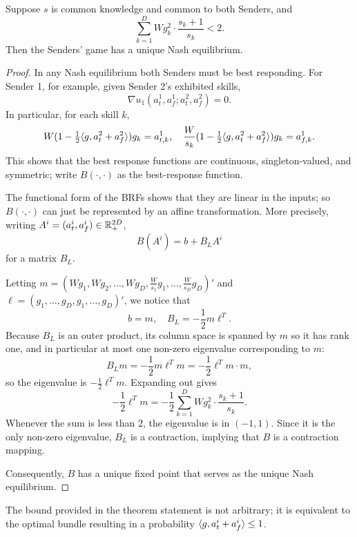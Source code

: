 \begin{theorem}
    Suppose $s$ is common knowledge and common to both Senders, and $$\sum_{k=1}^D Wg_k^2 \cdot \dfrac{s_k+1}{s_k}<2.$$ Then the Senders' game has a unique Nash equilibrium.
\end{theorem}
\begin{proof}
    In any Nash equilibrium both Senders must be best responding. For Sender 1, for example, given Sender 2's exhibited skills, $$\nabla u_1(a_t^1,a_f^1; a_t^2,a_f^2)=0.$$ In particular, for each skill $k$, $$W(1-\tfrac 1 2\langle g,a_t^2+a_f^2\rangle)g_k=a_{t,k}^1, \quad \dfrac W{s_k}(1-\tfrac 1 2\langle g,a_t^2+a_f^2\rangle)g_k=a_{f,k}^1.$$ This shows that the best response functions are continuous, singleton-valued, and symmetric; write $B(\cdot,\cdot)$ as the best-response function.

    The functional form of the BRFs shows that they are linear in the inputs; so $B(\cdot,\cdot)$ can just be represented by an affine transformation. More precisely, writing $A^i=(a_t^i,a_f^i) \in \mathbb{R}^{2D}_+$, $$B(A^i)=b+B_LA^i$$ for a matrix $B_L$.

    Letting $m=(Wg_1, Wg_2,\dots,Wg_D,\tfrac W{s_1}g_1,\dots,\tfrac W{s_D}g_D)'$ and $\ell=(g_1,\dots,g_D,g_1,\dots,g_D)'$, we notice that $$b=m, \quad B_L= -\dfrac 1 2 m\ell^T.$$ Because $B_L$ is an outer product, its column space is spanned by $m$ so it has rank one, and in particular at most one non-zero eigenvalue corresponding to $m$: $$B_Lm=-\dfrac 1 2 m\ell^Tm=-\dfrac{1}2\ell^Tm \cdot m,$$ so the eigenvalue is $-\tfrac 1 2 \ell^Tm$. Expanding out gives $$-\dfrac 1 2 \ell^Tm=-\dfrac 1 2 \sum_{k=1}^D W g_k^2 \cdot \dfrac{s_k+1}{s_k}.$$ Whenever the sum is less than $2$, the eigenvalue is in $(-1,1)$. Since it is the only non-zero eigenvalue, $B_L$ is a contraction, implying that $B$ is a contraction mapping.

    Consequently, $B$ has a unique fixed point that serves as the unique Nash equilibrium.
\end{proof}

\noindent The bound provided in the theorem statement is not arbitrary; it is equivalent to the optimal bundle resulting in a probability $\langle g,a_t^i+a_f^i\rangle \leq 1$.

